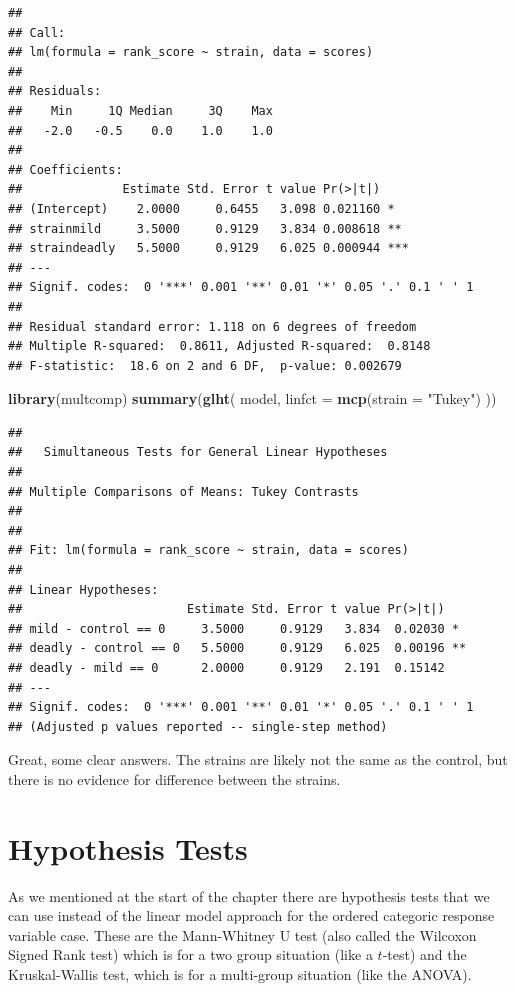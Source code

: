 \documentclass[
]{book}
\newenvironment{Shaded}{\begin{snugshade}}{\end{snugshade}}
\newcommand{\DataTypeTok}[1]{\textcolor[rgb]{0.13,0.29,0.53}{#1}}
\newcommand{\KeywordTok}[1]{\textcolor[rgb]{0.13,0.29,0.53}{\textbf{#1}}}
\newcommand{\NormalTok}[1]{#1}
\newcommand{\StringTok}[1]{\textcolor[rgb]{0.31,0.60,0.02}{#1}}
\begin{document}
\begin{verbatim}
## 
## Call:
## lm(formula = rank_score ~ strain, data = scores)
## 
## Residuals:
##    Min     1Q Median     3Q    Max 
##   -2.0   -0.5    0.0    1.0    1.0 
## 
## Coefficients:
##              Estimate Std. Error t value Pr(>|t|)    
## (Intercept)    2.0000     0.6455   3.098 0.021160 *  
## strainmild     3.5000     0.9129   3.834 0.008618 ** 
## straindeadly   5.5000     0.9129   6.025 0.000944 ***
## ---
## Signif. codes:  0 '***' 0.001 '**' 0.01 '*' 0.05 '.' 0.1 ' ' 1
## 
## Residual standard error: 1.118 on 6 degrees of freedom
## Multiple R-squared:  0.8611,	Adjusted R-squared:  0.8148 
## F-statistic:  18.6 on 2 and 6 DF,  p-value: 0.002679
\end{verbatim}

\begin{Shaded}
\begin{Highlighting}[]
\KeywordTok{library}\NormalTok{(multcomp)}
\KeywordTok{summary}\NormalTok{(}\KeywordTok{glht}\NormalTok{(}
\NormalTok{  model, }\DataTypeTok{linfct =} \KeywordTok{mcp}\NormalTok{(}\DataTypeTok{strain =} \StringTok{"Tukey"}\NormalTok{)}
\NormalTok{))}
\end{Highlighting}
\end{Shaded}

\begin{verbatim}
## 
## 	 Simultaneous Tests for General Linear Hypotheses
## 
## Multiple Comparisons of Means: Tukey Contrasts
## 
## 
## Fit: lm(formula = rank_score ~ strain, data = scores)
## 
## Linear Hypotheses:
##                       Estimate Std. Error t value Pr(>|t|)   
## mild - control == 0     3.5000     0.9129   3.834  0.02030 * 
## deadly - control == 0   5.5000     0.9129   6.025  0.00196 **
## deadly - mild == 0      2.0000     0.9129   2.191  0.15142   
## ---
## Signif. codes:  0 '***' 0.001 '**' 0.01 '*' 0.05 '.' 0.1 ' ' 1
## (Adjusted p values reported -- single-step method)
\end{verbatim}

Great, some clear answers. The strains are likely not the same as the control, but there is no evidence for difference between the strains.

\hypertarget{hypothesis-tests}{%
\section{Hypothesis Tests}\label{hypothesis-tests}}

As we mentioned at the start of the chapter there are hypothesis tests that we can use instead of the linear model approach for the ordered categoric response variable case. These are the Mann-Whitney U test (also called the Wilcoxon Signed Rank test) which is for a two group situation (like a \(t\)-test) and the Kruskal-Wallis test, which is for a multi-group situation (like the ANOVA).
\end{document}
